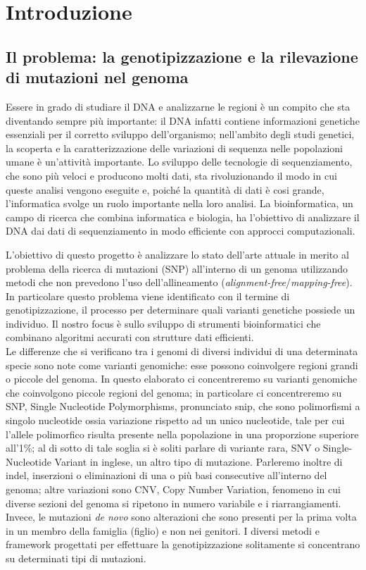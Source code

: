 \documentclass[../main.tex]{subfiles}
\begin{document}
\section{Introduzione} 

\subsection{Il problema: la genotipizzazione e la rilevazione di mutazioni nel genoma}

Essere in grado di studiare il DNA e analizzarne le regioni è un compito che sta diventando sempre più importante: il DNA infatti contiene informazioni genetiche essenziali per il corretto sviluppo dell'organismo; nell'ambito degli studi genetici, la scoperta e la caratterizzazione delle variazioni di sequenza nelle popolazioni umane è un'attività importante. Lo sviluppo delle tecnologie di sequenziamento, che sono più veloci e producono molti dati, sta rivoluzionando il modo in cui queste analisi vengono eseguite e, poiché la quantità di dati è cosi grande, l'informatica svolge un ruolo importante nella loro analisi. La bioinformatica, un campo di ricerca che combina informatica e biologia, ha l'obiettivo di analizzare il DNA dai dati di sequenziamento in modo efficiente con approcci computazionali. 

L'obiettivo di questo progetto è analizzare lo stato dell'arte attuale in merito al problema della ricerca di mutazioni (SNP) all'interno di un genoma utilizzando metodi che non prevedono l'uso dell'allineamento (\textit{alignment-free}/\textit{mapping-free}). In particolare questo problema viene identificato con il termine di genotipizzazione, il processo per determinare quali varianti genetiche possiede un individuo. Il nostro focus è sullo sviluppo di strumenti bioinformatici che combinano algoritmi accurati con strutture dati efficienti. \\

\noindent
Le differenze che si verificano tra i genomi di diversi individui di una determinata specie sono note come varianti genomiche: esse possono coinvolgere regioni grandi o piccole del genoma. 
In questo elaborato ci concentreremo su varianti genomiche che coinvolgono piccole regioni del genoma; in particolare ci concentreremo su SNP, Single Nucleotide Polymorphisms, pronunciato snip, che sono polimorfismi a singolo nucleotide ossia variazione rispetto ad un unico nucleotide, tale per cui l'allele polimorfico risulta presente nella popolazione in una proporzione superiore all'1\%; al di sotto di tale soglia si è soliti parlare di variante rara, SNV o Single-Nucleotide Variant in inglese, un altro tipo di mutazione. Parleremo inoltre di indel, inserzioni o eliminazioni di una o più basi consecutive all'interno del genoma; altre variazioni sono CNV, Copy Number Variation, fenomeno in cui diverse sezioni del genoma si ripetono in numero variabile e i riarrangiamenti. Invece, le mutazioni \textit{de novo} sono alterazioni che sono presenti per la prima volta in un membro della famiglia (figlio) e non nei genitori. I diversi metodi e framework progettati per effettuare la genotipizzazione solitamente si concentrano su determinati tipi di mutazioni.
\end{document}

